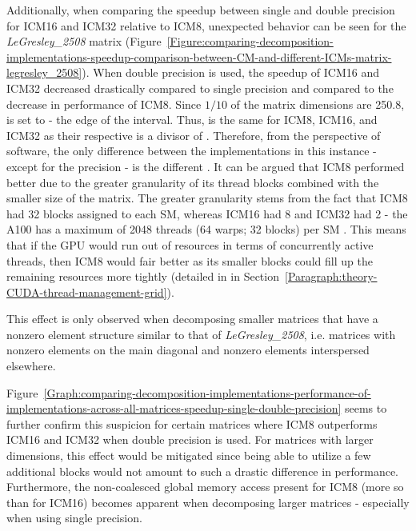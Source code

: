 Additionally, when comparing the speedup between single and double precision for ICM16 and ICM32 relative to ICM8, unexpected behavior can be seen for the \textit{LeGresley\_2508} matrix (Figure~\ref{Figure:comparing-decomposition-implementations-speedup-comparison-between-CM-and-different-ICMs-matrix-legresley_2508}). When double precision is used, the speedup of ICM16 and ICM32 decreased drastically compared to single precision and compared to the decrease in performance of ICM8. Since $ 1/10 $ of the matrix dimensions are 250.8,  is set to  - the edge of the interval. Thus,  is the same for ICM8, ICM16, and ICM32 as their respective  is a divisor of . Therefore, from the perspective of software, the only difference between the implementations in this instance - except for the precision - is the different . It can be argued that ICM8 performed better due to the greater granularity of its thread blocks combined with the smaller size of the matrix. The greater granularity stems from the fact that ICM8 had 32 blocks assigned to each SM, whereas ICM16 had 8 and ICM32 had  2 - the A100 has a maximum of 2048 threads (64 warps; 32 blocks) per SM \cite{soj8qSRbfefUdi8Y}. This means that if the GPU would run out of resources in terms of concurrently active threads, then ICM8 would fair better as its smaller blocks could fill up the remaining resources more tightly (detailed in \textit{} in Section~\ref{Paragraph:theory-CUDA-thread-management-grid}).

\par This effect is only observed when decomposing smaller matrices that have a nonzero element structure similar to that of \textit{LeGresley\_2508}, i.e. matrices with nonzero elements on the main diagonal and nonzero elements interspersed elsewhere.

\par Figure~\ref{Graph:comparing-decomposition-implementations-performance-of-implementations-across-all-matrices-speedup-single-double-precision} seems to further confirm this suspicion for certain matrices where ICM8 outperforms ICM16 and ICM32 when double precision is used. For matrices with larger dimensions, this effect would be mitigated since being able to utilize a few additional blocks would not amount to such a drastic difference in performance. Furthermore, the non-coalesced global memory access present for ICM8 (more so than for ICM16) becomes apparent when decomposing larger matrices - especially when using single precision.

